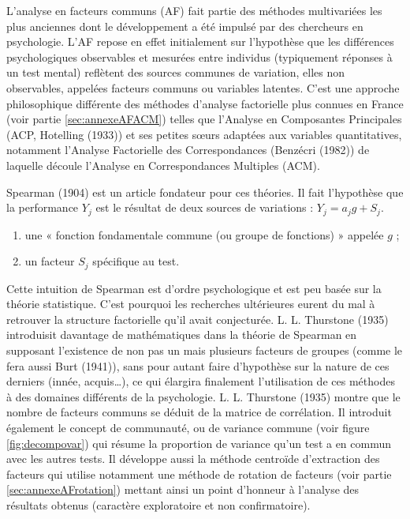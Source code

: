 \documentclass[12pt,a4paper]{reedthesis}
\begin{document}
L'analyse en facteurs communs (AF) fait partie des méthodes multivariées les plus anciennes dont le développement a été impulsé par des chercheurs en psychologie. L'AF repose en effet initialement sur l'hypothèse que les différences psychologiques observables et mesurées entre individus (typiquement réponses à un test mental) reflètent des sources communes de variation, elles non observables, appelées facteurs communs ou variables latentes. C'est une approche philosophique différente des méthodes d'analyse factorielle plus connues en France (voir partie \ref{sec:annexeAFACM}) telles que l'Analyse en Composantes Principales (ACP, Hotelling (1933)) et ses petites sœurs adaptées aux variables quantitatives, notamment l'Analyse Factorielle des Correspondances (Benzécri (1982)) de laquelle découle l'Analyse en Correspondances Multiples (ACM).

Spearman (1904) est un article fondateur pour ces théories. Il fait l'hypothèse que la performance \(Y_j\) est le résultat de deux sources de variations : \(Y_j = a_j g + S_j\).
\begin{enumerate}
\def\labelenumi{\arabic{enumi}.}
\item
  une « fonction fondamentale commune (ou groupe de fonctions) » appelée \(g\) ;
\item
  un facteur \(S_j\) spécifique au test.
\end{enumerate}
Cette intuition de Spearman est d'ordre psychologique et est peu basée sur la théorie statistique. C'est pourquoi les recherches ultérieures eurent du mal à retrouver la structure factorielle qu'il avait conjecturée. L. L. Thurstone (1935) introduisit davantage de mathématiques dans la théorie de Spearman en supposant l'existence de non pas un mais plusieurs facteurs de groupes (comme le fera aussi Burt (1941)), sans pour autant faire d'hypothèse sur la nature de ces derniers (innée, acquis\ldots), ce qui élargira finalement l'utilisation de ces méthodes à des domaines différents de la psychologie. L. L. Thurstone (1935) montre que le nombre de facteurs communs se déduit de la matrice de corrélation. Il introduit également le concept de communauté, ou de variance commune (voir figure \ref{fig:decompovar}) qui résume la proportion de variance qu'un test a en commun avec les autres tests. Il développe aussi la méthode centroïde d'extraction des facteurs qui utilise notamment une méthode de rotation de facteurs (voir partie \ref{sec:annexeAFrotation}) mettant ainsi un point d'honneur à l'analyse des résultats obtenus (caractère exploratoire et non confirmatoire).
\end{document}
